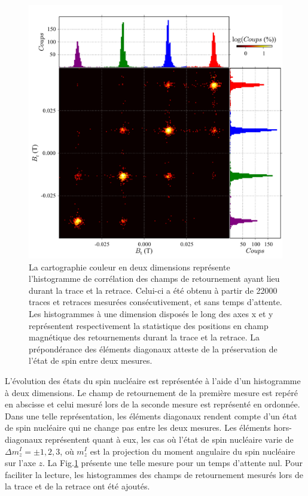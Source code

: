 \begin{figure}
\includegraphics[scale=0.45]{Resultats/Hist2D/Hist2D.pdf} 
\caption{La cartographie couleur en deux dimensions représente l’histogramme de corrélation des champs de retournement ayant lieu durant la trace et la retrace. Celui-ci a été obtenu à partir de 22000 traces et retraces mesurées consécutivement, et sans temps d'attente. Les histogrammes à une dimension disposés le long des axes x et y représentent respectivement la statistique des positions en champ magnétique des retournements durant la trace et la retrace. La prépondérance des éléments diagonaux atteste de la préservation de l'état de spin entre deux mesures.}
\label{correlations}
\end{figure}


L'évolution des états du spin nucléaire est représentée à l'aide d'un histogramme à deux dimensions. Le champ de retournement de la première mesure est repéré en abscisse et celui mesuré lors de la seconde mesure est représenté en ordonnée. Dans une telle représentation, les éléments diagonaux rendent compte d'un état de spin nucléaire qui ne change pas entre les deux mesures. Les éléments hors-diagonaux représentent quant à eux, les cas où l'état de spin nucléaire varie de $\Delta m_z^I = \pm 1,2,3$, où $m_z^I$ est la projection du moment angulaire du spin nucléaire sur l'axe $z$. La Fig.\ref{correlations} présente une telle mesure pour un temps d'attente nul. Pour faciliter la lecture, les histogrammes des champs de retournement mesurés lors de la trace et de la retrace ont été ajoutés.

